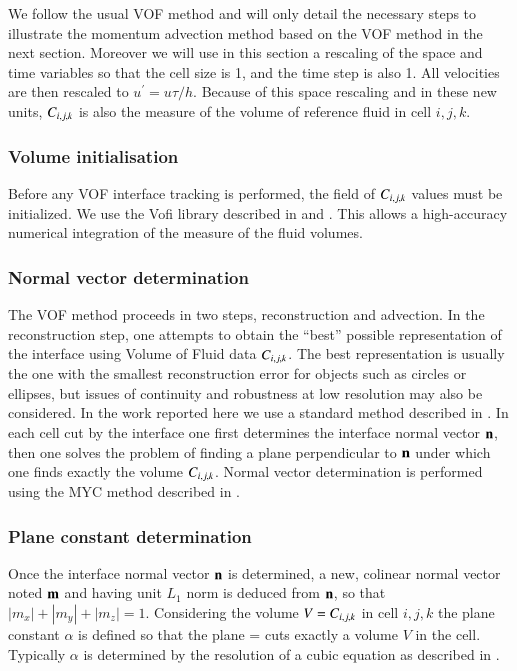 We follow the usual VOF method and will only detail the necessary steps to illustrate the momentum advection method based on the VOF method in the next section. Moreover we will use in this section a rescaling of the space and time variables so that the cell size is 1, and the time step is also 1. All velocities are then rescaled to $u^\prime = u \tau / h$. Because of this space rescaling and in these new units, $C_{i,j,k}$ is also the measure of the volume of reference fluid in cell $i,j,k$.


\subsubsection{Volume initialisation}

Before any VOF interface tracking is performed, the field of $C_{i,j,k}$
values must be initialized. We use the {\sc Vofi} library described in \cite{bna2015numerical} and \cite{bna2016vofi}. 
This allows a high-accuracy numerical integration of the measure of the fluid volumes. 

\subsubsection{Normal vector determination} 

The VOF method proceeds in two steps, reconstruction and advection. In
the reconstruction step, one attempts to obtain the ``best'' possible representation of the interface 
using Volume of Fluid data $C_{i,j,k}$. The best representation is usually the one with the smallest 
reconstruction error for objects such as circles or ellipses, but issues of continuity and robustness 
at low resolution may also be considered. In the work reported here 
we use a standard method  described in \cite{Tryggvason11}.  In each cell cut by the interface
one first determines the interface normal
vector ${\bf n}$, then one solves the problem of finding a plane perpendicular
to ${\bf n}$ under which one finds exactly the volume $C_{i,j,k}$. Normal vector determination
is performed using the MYC method described in \cite{Tryggvason11}. 

\subsubsection{Plane constant determination}

Once the interface normal vector ${\bf n}$ is determined, a new,
colinear normal vector noted ${\bf m}$ and having unit $L_1$ norm is
deduced from ${\bf n}$, so that $|m_x| + |m_y| + |m_z|=1$. Considering the
volume $V=C_{i,j,k}$ in cell $i,j,k$ the plane constant $\alpha$ is
defined so that the plane 
\be 
\M \cdot \X = \alpha \label{mxalpha}
\nd 
cuts exactly a volume $V$ in the cell.   
Typically $\alpha$ is determined by the resolution of a cubic equation as described
in \cite{Scardovelli00}.


